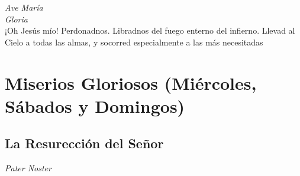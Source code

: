 \documentclass[a4paper,11pt, oneside]{report}
\begin{document}
      \textit{Ave María} \\
      \indent\textit{Gloria} \\
      \indent¡Oh Jesús mío! Perdonadnos. Libradnos del fuego enterno del infierno. Llevad al Cielo a todas las almas, y socorred especialmente a las más 
      necesitadas
        
  \section*{ Miserios Gloriosos (Miércoles, Sábados y Domingos)}
    \subsection*{ La Resurección del Señor }
      
      \textit{Pater Noster}
\end{document}
